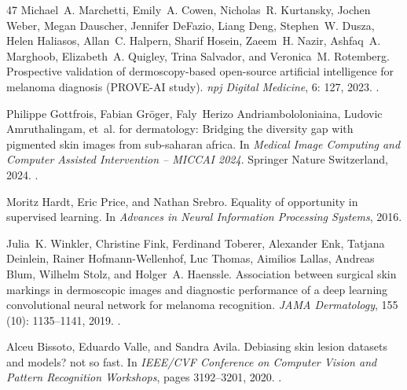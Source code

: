 \documentclass[11pt]{article}
\begin{document}
\begin{thebibliography}{47}
Michael~A. Marchetti, Emily~A. Cowen, Nicholas~R. Kurtansky, Jochen Weber,
  Megan Dauscher, Jennifer DeFazio, Liang Deng, Stephen~W. Dusza, Helen
  Haliasos, Allan~C. Halpern, Sharif Hosein, Zaeem~H. Nazir, Ashfaq~A.
  Marghoob, Elizabeth~A. Quigley, Trina Salvador, and Veronica~M. Rotemberg.
\newblock Prospective validation of dermoscopy-based open-source artificial
  intelligence for melanoma diagnosis ({PROVE-AI} study).
\newblock \emph{npj Digital Medicine}, 6: 127, 2023.
\newblock {}.

Philippe Gottfrois, Fabian Gr{\"o}ger, Faly~Herizo Andriambololoniaina, Ludovic
  Amruthalingam, et~al.
 for dermatology: Bridging the diversity gap with pigmented
  skin images from sub-saharan africa.
\newblock In \emph{Medical Image Computing and Computer Assisted Intervention
  -- MICCAI 2024}. Springer Nature Switzerland, 2024.
\newblock {}.

Moritz Hardt, Eric Price, and Nathan Srebro.
\newblock Equality of opportunity in supervised learning.
\newblock In \emph{Advances in Neural Information Processing Systems}, 2016.

Julia~K. Winkler, Christine Fink, Ferdinand Toberer, Alexander Enk, Tatjana
  Deinlein, Rainer Hofmann-Wellenhof, Luc Thomas, Aimilios Lallas, Andreas
  Blum, Wilhelm Stolz, and Holger~A. Haenssle.
\newblock Association between surgical skin markings in dermoscopic images and
  diagnostic performance of a deep learning convolutional neural network for
  melanoma recognition.
\newblock \emph{JAMA Dermatology}, 155 (10): 1135--1141,
  2019.
\newblock {}.

Alceu Bissoto, Eduardo Valle, and Sandra Avila.
\newblock Debiasing skin lesion datasets and models? not so fast.
\newblock In \emph{IEEE/CVF Conference on Computer Vision and Pattern
  Recognition Workshops}, pages 3192--3201, 2020.
\newblock {}.


\end{thebibliography}
\end{document}
